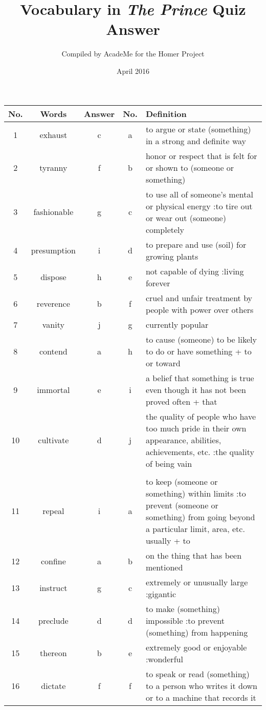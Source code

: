 \documentclass[a4paper]{article}
\title{Vocabulary in \textit{The Prince} Quiz Answer}
\author{Compiled by AcadeMe for the Homer Project}
\date{April 2016}
\begin{document}
\maketitle
\begin{center}
\begin{tabular}{|c|c|c|c|m{}|}
\hline
No. & Words & Answer & No. & Definition \\
\hline
 1  & exhaust & c & a &  to argue or state (something) in a strong and definite way \\
\hline
 2  & tyranny & f & b &  honor or respect that is felt for or shown to (someone or something) \\
\hline
 3  & fashionable & g & c &  to use all of someone's mental or physical energy :to tire out or wear out (someone) completely \\
\hline
 4  & presumption & i & d &  to prepare and use (soil) for growing plants \\
\hline
 5  & dispose & h & e &  not capable of dying :living forever \\
\hline
 6  & reverence & b & f &  cruel and unfair treatment by people with power over others \\
\hline
 7  & vanity & j & g &  currently popular \\
\hline
 8  & contend & a & h &  to cause (someone) to be likely to do or have something + to or toward \\
\hline
 9  & immortal & e & i &  a belief that something is true even though it has not been proved often + that \\
\hline
 10  & cultivate & d & j &  the quality of people who have too much pride in their own appearance, abilities, achievements, etc. :the quality of being vain \\
\hline
 & & & & \\
\hline
 11  & repeal & i & a &  to keep (someone or something) within limits :to prevent (someone or something) from going beyond a particular limit, area, etc. usually + to \\
\hline
 12  & confine & a & b &  on the thing that has been mentioned \\
\hline
 13  & instruct & g & c &  extremely or unusually large :gigantic \\
\hline
 14  & preclude & d & d &  to make (something) impossible :to prevent (something) from happening \\
\hline
 15  & thereon & b & e &  extremely good or enjoyable :wonderful \\
\hline
 16  & dictate & f & f &  to speak or read (something) to a person who writes it down or to a machine that records it \\

\end{tabular}
\end{center}
\end{document}
